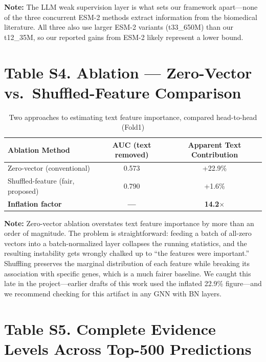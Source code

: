 \documentclass[12pt,a4paper]{article}
\begin{document}
\textbf{Note:} The LLM weak supervision layer is what sets our framework apart---none of the three concurrent ESM-2 methods extract information from the biomedical literature. All three also use larger ESM-2 variants (t33\_650M) than our t12\_35M, so our reported gains from ESM-2 likely represent a lower bound.

\section*{Table S4. Ablation --- Zero-Vector vs.\ Shuffled-Feature Comparison}

\begin{table}[ht]
\centering
\caption{Two approaches to estimating text feature importance, compared head-to-head (Fold1)}
\label{tab:s4}
\begin{tabular}{lcc}
\toprule
\textbf{Ablation Method} & \textbf{AUC (text removed)} & \textbf{Apparent Text Contribution} \\
\midrule
Zero-vector (conventional) & 0.573 & +22.9\% \\
Shuffled-feature (fair, proposed) & 0.790 & +1.6\% \\
\midrule
\textbf{Inflation factor} & \textbf{---} & \textbf{14.2$\times$} \\
\bottomrule
\end{tabular}
\end{table}

\textbf{Note:} Zero-vector ablation overstates text feature importance by more than an order of magnitude. The problem is straightforward: feeding a batch of all-zero vectors into a batch-normalized layer collapses the running statistics, and the resulting instability gets wrongly chalked up to ``the features were important.'' Shuffling preserves the marginal distribution of each feature while breaking its association with specific genes, which is a much fairer baseline. We caught this late in the project---earlier drafts of this work used the inflated 22.9\% figure---and we recommend checking for this artifact in any GNN with BN layers.

\section*{Table S5. Complete Evidence Levels Across Top-500 Predictions}
\end{document}
